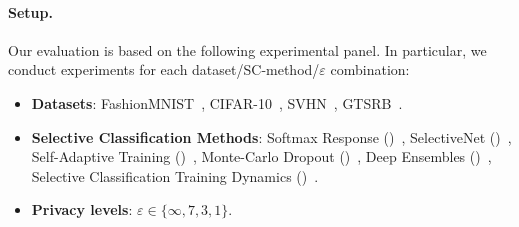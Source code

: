 \paragraph{Setup.} %
Our evaluation is based on the following experimental panel. In particular, we conduct experiments for each dataset/SC-method/$\varepsilon$ combination:
\begin{itemize}
    \item \textbf{Datasets}: FashionMNIST~\citep{xiao2017fashion}, CIFAR-10~\citep{krizhevsky2009learning}, SVHN~\citep{netzer2011reading}, GTSRB~\citep{Houben-IJCNN-2013}.
    \item \textbf{Selective Classification Methods}: Softmax Response (\sr)~\citep{geifman2017selective}, SelectiveNet (\sn)~\citep{geifman2019selectivenet}, Self-Adaptive Training (\sat)~\citep{huang2020self}, Monte-Carlo Dropout (\mcdo)~\citep{gal2016dropout}, Deep Ensembles (\de)~\citep{lakshminarayanan2017simple}, Selective Classification Training Dynamics (\sctd)~\citep{rabanser2022selective}.
    \item \textbf{Privacy levels}: $\varepsilon \in \{\infty, 7, 3, 1\}$.
\end{itemize}
